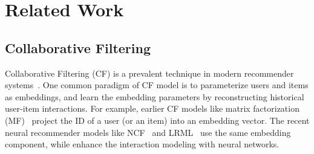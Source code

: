 \section{Related Work}\label{sec:related}

\subsection{Collaborative Filtering}
Collaborative Filtering (CF) is a prevalent technique in modern recommender systems~\cite{YoutubeRS,PinSage}.
One common paradigm of CF model is to parameterize users and items as embeddings, and learn the embedding parameters by reconstructing historical user-item interactions.
For example, earlier CF models like matrix factorization (MF)~\cite{MF,BPRMF} project the ID of a user (or an item) into an embedding vector. The recent neural recommender models like NCF~\cite{NCF} and LRML~\cite{tay2018latent} use the same embedding component, while enhance the interaction modeling with neural networks. 



